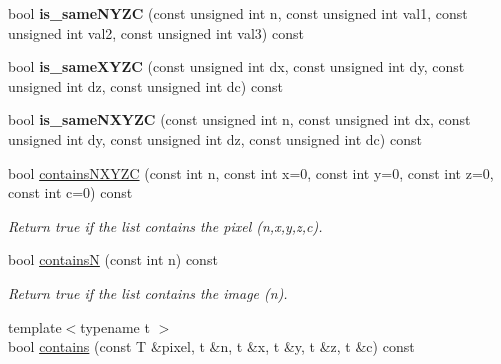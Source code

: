 \begin{DoxyCompactItemize}
\item 
\hypertarget{structcimg__library_1_1CImgList_aa509e9da5b5978e091003484d6060851}{
bool {\bfseries is\_\-sameNYZC} (const unsigned int n, const unsigned int val1, const unsigned int val2, const unsigned int val3) const }
\label{structcimg__library_1_1CImgList_aa509e9da5b5978e091003484d6060851}

\item 
\hypertarget{structcimg__library_1_1CImgList_ae7f057fedc9005f4bcdaaf568bd9031a}{
bool {\bfseries is\_\-sameXYZC} (const unsigned int dx, const unsigned int dy, const unsigned int dz, const unsigned int dc) const }
\label{structcimg__library_1_1CImgList_ae7f057fedc9005f4bcdaaf568bd9031a}

\item 
\hypertarget{structcimg__library_1_1CImgList_a7287ccec1d27b4ee66e9b3ec91a404df}{
bool {\bfseries is\_\-sameNXYZC} (const unsigned int n, const unsigned int dx, const unsigned int dy, const unsigned int dz, const unsigned int dc) const }
\label{structcimg__library_1_1CImgList_a7287ccec1d27b4ee66e9b3ec91a404df}

\item 
\hypertarget{structcimg__library_1_1CImgList_ab1bae0ba7a5d78c14ed581ac26146536}{
bool \hyperlink{structcimg__library_1_1CImgList_ab1bae0ba7a5d78c14ed581ac26146536}{containsNXYZC} (const int n, const int x=0, const int y=0, const int z=0, const int c=0) const }
\label{structcimg__library_1_1CImgList_ab1bae0ba7a5d78c14ed581ac26146536}

\begin{DoxyCompactList}\small\item\em Return {\ttfamily true} if the list contains the pixel (n,x,y,z,c). \item\end{DoxyCompactList}\item 
\hypertarget{structcimg__library_1_1CImgList_a974d8aafd86ec4b19b6725e1fd02dfa9}{
bool \hyperlink{structcimg__library_1_1CImgList_a974d8aafd86ec4b19b6725e1fd02dfa9}{containsN} (const int n) const }
\label{structcimg__library_1_1CImgList_a974d8aafd86ec4b19b6725e1fd02dfa9}

\begin{DoxyCompactList}\small\item\em Return {\ttfamily true} if the list contains the image (n). \item\end{DoxyCompactList}\item 
\hypertarget{structcimg__library_1_1CImgList_afd6e74dd0035fca58beeef2edbcf1c04}{
{\footnotesize template$<$typename t $>$ }\\bool \hyperlink{structcimg__library_1_1CImgList_afd6e74dd0035fca58beeef2edbcf1c04}{contains} (const T \&pixel, t \&n, t \&x, t \&y, t \&z, t \&c) const }
\label{structcimg__library_1_1CImgList_afd6e74dd0035fca58beeef2edbcf1c04}


\end{DoxyCompactItemize}
